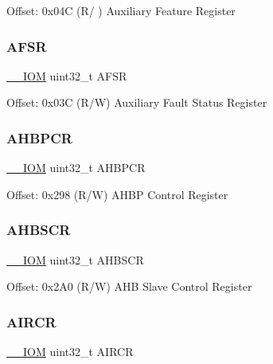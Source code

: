 Offset\+: 0x04C (R/ ) Auxiliary Feature Register \mbox{\label{struct_s_c_b___type_a3ef0057e48fdef798f2ee12125a80d9f}} 
\subsubsection{\texorpdfstring{A\+F\+SR}{AFSR}}
{\footnotesize\ttfamily \mbox{\hyperlink{core__cm4_8h_ab6caba5853a60a17e8e04499b52bf691}{\+\_\+\+\_\+\+I\+OM}} uint32\+\_\+t A\+F\+SR}

Offset\+: 0x03C (R/W) Auxiliary Fault Status Register \mbox{\label{struct_s_c_b___type_a209b4026c2994d0e18e883aa9af5c3cc}} 
\subsubsection{\texorpdfstring{A\+H\+B\+P\+CR}{AHBPCR}}
{\footnotesize\ttfamily \mbox{\hyperlink{core__cm4_8h_ab6caba5853a60a17e8e04499b52bf691}{\+\_\+\+\_\+\+I\+OM}} uint32\+\_\+t A\+H\+B\+P\+CR}

Offset\+: 0x298 (R/W) A\+H\+BP Control Register \mbox{\label{struct_s_c_b___type_a25bb4ac449a4122217e2ca74b9ad4e3e}} 
\subsubsection{\texorpdfstring{A\+H\+B\+S\+CR}{AHBSCR}}
{\footnotesize\ttfamily \mbox{\hyperlink{core__cm4_8h_ab6caba5853a60a17e8e04499b52bf691}{\+\_\+\+\_\+\+I\+OM}} uint32\+\_\+t A\+H\+B\+S\+CR}

Offset\+: 0x2\+A0 (R/W) A\+HB Slave Control Register \mbox{\label{struct_s_c_b___type_a9b6ccd9c0c0865f8facad77ea37240b0}} 
\subsubsection{\texorpdfstring{A\+I\+R\+CR}{AIRCR}}
{\footnotesize\ttfamily \mbox{\hyperlink{core__cm4_8h_ab6caba5853a60a17e8e04499b52bf691}{\+\_\+\+\_\+\+I\+OM}} uint32\+\_\+t A\+I\+R\+CR}


